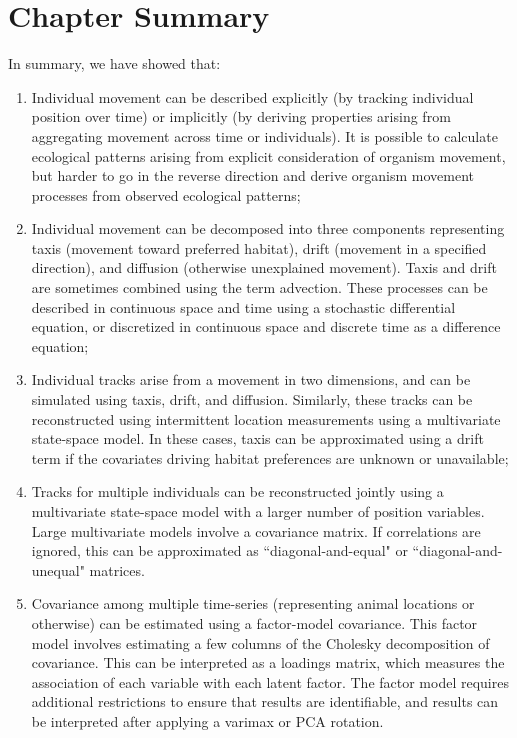 \section{Chapter Summary}

In summary, we have showed that:
\begin{enumerate}
    \item Individual movement can be described explicitly (by tracking individual position over time) or implicitly (by deriving properties arising from aggregating movement across time or individuals). It is possible to calculate ecological patterns arising from explicit consideration of organism movement, but harder to go in the reverse direction and derive organism movement processes from observed ecological patterns;

    \item Individual movement can be decomposed into three components representing taxis (movement toward preferred habitat), drift (movement in a specified direction), and diffusion (otherwise unexplained movement).  Taxis and drift are sometimes combined using the term advection.  These processes can be described in continuous space and time using a stochastic differential equation, or discretized in continuous space and discrete time as a difference equation;  

    \item Individual tracks arise from a movement in two dimensions, and can be simulated using taxis, drift, and diffusion.  Similarly, these tracks can be reconstructed using intermittent location measurements using a multivariate state-space model. In these cases, taxis can be approximated using a drift term if the covariates driving habitat preferences are unknown or unavailable;
    
    \item Tracks for multiple individuals can be reconstructed jointly using a multivariate state-space model with a larger number of position variables.  Large multivariate models involve a covariance matrix. If correlations are ignored, this can be approximated as ``diagonal-and-equal" or ``diagonal-and-unequal" matrices.
    
    \item Covariance among multiple time-series (representing animal locations or otherwise) can be estimated using a factor-model covariance. This factor model involves estimating a few columns of the Cholesky decomposition of covariance.  This can be interpreted as a loadings matrix, which measures the association of each variable with each latent factor. The factor model requires additional restrictions to ensure that results are identifiable, and results can be interpreted after applying a varimax or PCA rotation.  
    

\end{enumerate}
